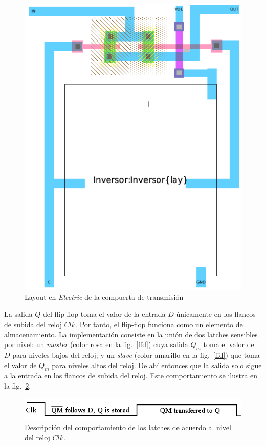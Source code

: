 \documentclass[twocolumn]{IEEEtran}
\begin{document}
\begin{figure}[H]
  \centering
    \includegraphics[scale=0.3]{./pics/layoutc.png}
      \caption{Layout en \textit{Electric} de la compuerta de transmisión}
	\label{layoutc}
\end{figure}
\noindent
La salida $Q$ del flip-flop toma el valor de la entrada $D$  únicamente  en los flancos de subida del reloj $Clk$. Por tanto, el flip-flop funciona como un elemento de almacenamiento. La implementación consiste en la unión de dos latches sensibles por nivel: un \textit{master} (color rosa en la fig.~\ref{ffd}) cuya salida $Q_m$ toma el valor de $D$ para niveles bajos del reloj; y un \textit{slave} (color amarillo en la fig.~\ref{ffd}) que toma el valor de $Q_m$ para niveles altos del reloj. De ahí entonces que la salida solo sigue a la entrada en los flancos de subida del reloj. Este comportamiento se ilustra en la fig.~\ref{ffbehavior}.
\begin{figure}[H]
  \centering
    \includegraphics[scale=0.4]{./pics/ffbehavior.png}
      \caption{Descripción del comportamiento de los latches de acuerdo al nivel del reloj $Clk$.}
	\label{ffbehavior}
\end{figure}
\end{document}
